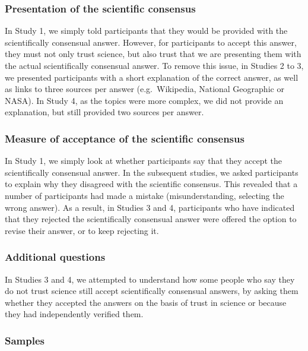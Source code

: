 \documentclass[
  doc,floatsintext]{apa6}
\begin{document}
\subsubsection{Presentation of the scientific consensus}\label{presentation-of-the-scientific-consensus}

In Study 1, we simply told participants that they would be provided with the scientifically consensual answer. However, for participants to accept this answer, they must not only trust science, but also trust that we are presenting them with the actual scientifically consensual answer. To remove this issue, in Studies 2 to 3, we presented participants with a short explanation of the correct answer, as well as links to three sources per answer (e.g.~Wikipedia, National Geographic or NASA). In Study 4, as the topics were more complex, we did not provide an explanation, but still provided two sources per answer.

\subsubsection{Measure of acceptance of the scientific consensus}\label{measure-of-acceptance-of-the-scientific-consensus}

In Study 1, we simply look at whether participants say that they accept the scientifically consensual answer. In the subsequent studies, we asked participants to explain why they disagreed with the scientific consensus. This revealed that a number of participants had made a mistake (misunderstanding, selecting the wrong answer). As a result, in Studies 3 and 4, participants who have indicated that they rejected the scientifically consensual answer were offered the option to revise their answer, or to keep rejecting it.

\subsubsection{Additional questions}\label{additional-questions}

In Studies 3 and 4, we attempted to understand how some people who say they do not trust science still accept scientifically consensual answers, by asking them whether they accepted the answers on the basis of trust in science or because they had independently verified them.

\subsubsection{Samples}\label{samples}
\end{document}
